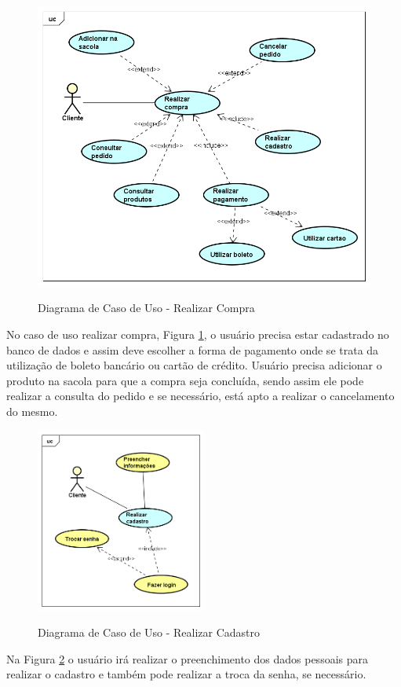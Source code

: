 \begin{figure}[H]
    \centering
    \caption{Diagrama de Caso de Uso -  Realizar Compra}
    \includegraphics[width=1.0\textwidth]{./dados/figuras/4_1}
    \label{fig:figura-1}
\end{figure}
No caso de uso realizar compra, Figura \ref{fig:figura-1}, o usuário precisa estar cadastrado no banco de dados e assim deve escolher a forma de pagamento onde se trata da utilização de boleto bancário ou cartão de crédito. Usuário precisa adicionar o produto na sacola para que a compra seja concluída, sendo assim ele pode realizar a consulta do pedido e se necessário, está apto a realizar o cancelamento do mesmo.

\begin{figure}[H]
    \centering
    \caption{Diagrama de Caso de Uso - Realizar Cadastro}
    \includegraphics[width=0.5\textwidth]{./dados/figuras/4_2}
    \label{fig:figura-2}
\end{figure}
Na Figura \ref{fig:figura-2} o usuário irá realizar o preenchimento dos dados pessoais para realizar o cadastro e também pode realizar a troca da senha, se necessário.

